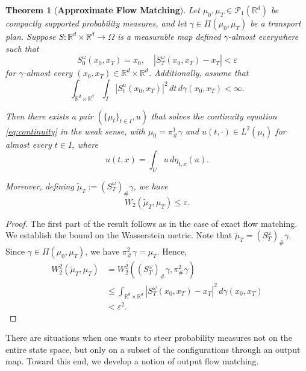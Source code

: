 \documentclass{article}
\newtheorem{theorem}{Theorem}[section]
\begin{document}
\begin{theorem}[\textbf{Approximate Flow Matching}]
\label{thm:approximate-flow}
Let $\mu_0, \mu_T \in \mathcal{P}_1(\mathbb{R}^d)$ be compactly supported probability measures, and let $\gamma \in \Pi(\mu_0, \mu_T)$ be a transport plan. Suppose $S: \mathbb{R}^d \times \mathbb{R}^d \rightarrow \Omega$ is a measurable map defined $\gamma$-almost everywhere such that 
\[S^{\omega}_0(x_0,x_T) = x_0, \quad |S^{\omega}_T(x_0,x_T) - x_T| < \varepsilon\]
for $\gamma$-almost every $(x_0,x_T) \in \mathbb{R}^d \times \mathbb{R}^d$. Additionally, assume that 
\begin{equation}
\int_{\mathbb{R}^d \times \mathbb{R}^d} \int_{I} |S^u_t(x_0,x_T)|^2 \, dt \, d\gamma(x_0,x_T) < \infty.
\end{equation}

Then there exists a pair $(\{\mu_t\}_{t \in I}, u)$ that solves the continuity equation \eqref{eq:continuity} in the weak sense, with $\mu_0 = \pi^1_{\#}\gamma$ and $u(t,\cdot) \in L^2(\mu_t)$ for almost every $t \in I$, where
\[u(t,x) = \int_{U} u \, d\eta_{t,x}(u).\]

Moreover, defining $\tilde{\mu}_T := (S^{\omega}_T)_{\#}\gamma$, we have
\[W_2(\tilde{\mu}_T, \mu_T) \leq \varepsilon.\]
\end{theorem}

\begin{proof}
The first part of the result follows as in the case of exact flow matching. We establish the bound on the Wasserstein metric. Note that $\tilde{\mu}_T = (S^\omega_T)_{\#}\gamma$. Since $\gamma \in \Pi(\mu_0, \mu_T)$, we have $\pi^2_{\#}\gamma = \mu_T$. Hence,
\begin{align}
W^2_2(\tilde{\mu}_T, \mu_T) &= W^2_2((S^\omega_T)_{\#}\gamma, \pi^2_{\#}\gamma) \\
&\leq \int_{\mathbb{R}^d \times \mathbb{R}^d} |S^\omega_T(x_0,x_T) - x_T|^2 \, d\gamma(x_0,x_T) \\
&< \varepsilon^2.
\end{align}
\end{proof}

There are situations when one wants to steer probability measures not on the entire state space, but only on a subset of the configurations through an output map. Toward this end, we develop a notion of output flow matching.
\end{document}
